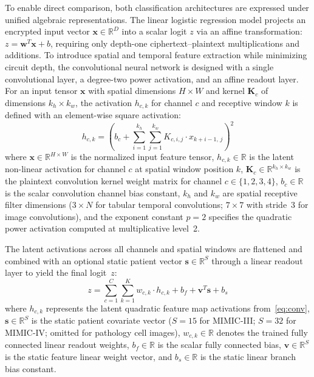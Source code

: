 \documentclass[conference]{IEEEtran}
\begin{document}
To enable direct comparison, both classification architectures are expressed under unified algebraic representations. The linear logistic regression model projects an encrypted input vector $\mathbf{x} \in \mathbb{R}^D$ into a scalar logit $z$ via an affine transformation: $z = \mathbf{w}^T \mathbf{x} + b$, requiring only depth-one ciphertext--plaintext multiplications and additions. To introduce spatial and temporal feature extraction while minimizing circuit depth, the convolutional neural network is designed with a single convolutional layer, a degree-two power activation, and an affine readout layer. For an input tensor $\mathbf{x}$ with spatial dimensions $H \times W$ and kernel $\mathbf{K}_c$ of dimensions $k_h \times k_w$, the activation $h_{c,k}$ for channel $c$ and receptive window $k$ is defined with an element-wise square activation:
\begin{equation}
h_{c,k} = \left( b_c + \sum_{i=1}^{k_h} \sum_{j=1}^{k_w} K_{c,i,j} \cdot x_{k+i-1,\, j} \right)^2
\label{eq:conv}
\end{equation}
where $\mathbf{x} \in \mathbb{R}^{H \times W}$ is the normalized input feature tensor, $h_{c,k} \in \mathbb{R}$ is the latent non-linear activation for channel $c$ at spatial window position $k$, $\mathbf{K}_c \in \mathbb{R}^{k_h \times k_w}$ is the plaintext convolution kernel weight matrix for channel $c \in \{1, 2, 3, 4\}$, $b_c \in \mathbb{R}$ is the scalar convolution channel bias constant, $k_h$ and $k_w$ are spatial receptive filter dimensions ($3 \times N$ for tabular temporal convolutions; $7 \times 7$ with stride~3 for image convolutions), and the exponent constant $p = 2$ specifies the quadratic power activation computed at multiplicative level~2.

The latent activations across all channels and spatial windows are flattened and combined with an optional static patient vector $\mathbf{s} \in \mathbb{R}^S$ through a linear readout layer to yield the final logit~$z$:
\begin{equation}
z = \sum_{c=1}^{C} \sum_{k=1}^{K} w_{c,k} \cdot h_{c,k} + b_f + \mathbf{v}^T \mathbf{s} + b_s
\label{eq:logit}
\end{equation}
where $h_{c,k}$ represents the latent quadratic feature map activations from~\eqref{eq:conv}, $\mathbf{s} \in \mathbb{R}^S$ is the static patient covariate vector ($S = 15$ for MIMIC-III; $S = 32$ for MIMIC-IV; omitted for pathology cell images), $w_{c,k} \in \mathbb{R}$ denotes the trained fully connected linear readout weights, $b_f \in \mathbb{R}$ is the scalar fully connected bias, $\mathbf{v} \in \mathbb{R}^S$ is the static feature linear weight vector, and $b_s \in \mathbb{R}$ is the static linear branch bias constant.
\end{document}
